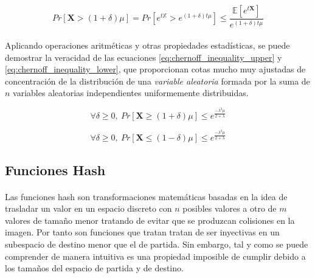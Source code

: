 \documentclass{subfiles}
\begin{document}
        \begin{equation}
        \label{eq:chernoff_inequality_raw}
          Pr[ \boldsymbol{X} > (1+\delta) \mu] =
          Pr[ e^{t \mathbb{X}} > e^{(1+\delta)t\mu}] \leq
          \frac{\mathbb{E}[ e^{t \boldsymbol{X}}] }{e^{(1 + \delta) t \mu}}
        \end{equation}

        \paragraph{}
        Aplicando operaciones aritméticas y otras propiedades estadísticas, se puede demostrar la veracidad de las ecuaciones \eqref{eq:chernoff_inequality_upper} y \eqref{eq:chernoff_inequality_lower}, que proporcionan cotas mucho muy ajustadas de concentración de la distribución de una \emph{variable aleatoria} formada por la suma de $n$ variables aleatorias independientes uniformemente distribuidas.

        \begin{equation}
        \label{eq:chernoff_inequality_upper}
          \forall \delta \geq 0, \ Pr[\boldsymbol{X} \geq (1 + \delta)\mu]  \leq e^\frac{-\lambda^2\mu}{2 + \lambda}
        \end{equation}

        \begin{equation}
        \label{eq:chernoff_inequality_lower}
          \forall \delta \geq 0, \ Pr[\boldsymbol{X} \leq (1 - \delta)\mu]  \leq e^\frac{-\lambda^2\mu}{2 + \lambda}
        \end{equation}

      \subsection{Funciones Hash}
      \label{sec:hash_functions}

        \paragraph{}
        Las funciones hash son transformaciones matemáticas basadas en la idea de trasladar un valor en un espacio discreto con $n$ posibles valores a otro de $m$ valores de tamaño menor tratando de evitar que se produzcan colisiones en la imagen. Por tanto son funciones que tratan tratan de ser inyectivas en un subespacio de destino menor que el de partida. Sin embargo, tal y como se puede comprender de manera intuitiva es una propiedad imposible de cumplir debido a los tamaños del espacio de partida y de destino.
\end{document}
